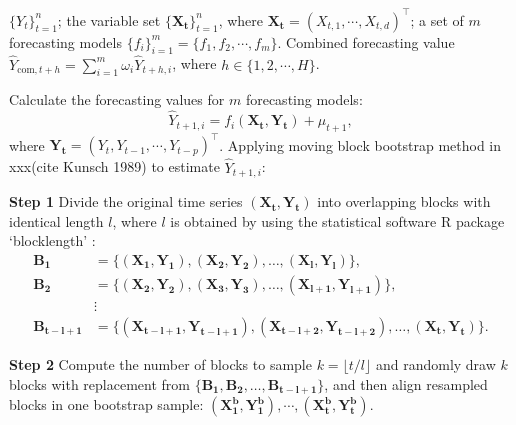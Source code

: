 \documentclass[12pt]{article}
\begin{document}
\begin{algorithm}
 \caption{The uncertainty-based combination forecasting method}
 \label{alg:lcs}
 \begin{algorithmic}[1]
  \REQUIRE $\{Y_t\}_{t=1}^{n}$; the variable set $\{\bm{X_t}\}_{t=1}^{n}$, where $\bm{X_t} = (X_{t,1}, \cdots, X_{t,d})^\top$; a set of $m$ forecasting models $\{f_i\}_{i=1}^m = \{f_1, f_2, \cdots, f_m\}$.
  \ENSURE Combined forecasting value $\hat{Y}_{\text{com}, t+h} = \sum_{i=1}^m {\omega_i\hat{Y}_{t+h,i}}$, where $h \in \{1, 2, \cdots, H\}$.
  
    \STATE Calculate the forecasting values for \(m\) forecasting models:
    \[
      \hat{Y}_{t+1,i} = f_i(\bm{X_t}, \bm{Y_t}) + \mu_{t+1}, 
    \]
    where $\bm{Y_t} = (Y_t, Y_{t-1}, \cdots, Y_{t-p})^\top$.
    \STATE Applying moving block bootstrap method in xxx(cite Kunsch 1989) to estimate $\hat{Y}_{t+1,i}$:
    
    \STATE \textbf{Step 1} Divide the original time series $(\bm{X_t},\bm{Y_t})$ into overlapping blocks with identical length $l$, where $l$ is obtained by using the statistical software R package `blocklength' :
    \[
      \begin{aligned}
        \bm{B_1} &= \{(\bm{X_1}, \bm{Y_1}), (\bm{X_2}, \bm{Y_2}), \dots, (\bm{X_l}, \bm{Y_l})\}, \\
        \bm{B_2} &= \{(\bm{X_2}, \bm{Y_2}), (\bm{X_3}, \bm{Y_3}), \dots, (\bm{X_{l+1}}, \bm{Y_{l+1}})\}, \\
        &\vdots \\
        \bm{B_{t-l+1}} &= \{(\bm{X_{t-l+1}}, \bm{Y_{t-l+1}}), (\bm{X_{t-l+2}}, \bm{Y_{t-l+2}}), \dots, (\bm{X_t}, \bm{Y_t})\}.
      \end{aligned}
    \]
    
    \STATE \textbf{Step 2} Compute the number of blocks to sample \( k = \lfloor t / l \rfloor \) and randomly draw \( k \) blocks with replacement from \( \{\bm{B_1}, \bm{B_2}, \dots, \bm{B_{t-l+1}}\} \), and then align resampled blocks in one bootstrap sample: \( (\bm{X_1^b}, \bm{Y_1^b}), \cdots, (\bm{X_{t}^b}, \bm{Y_t^b}) \).
    

\end{algorithmic}
\end{algorithm}
\end{document}
